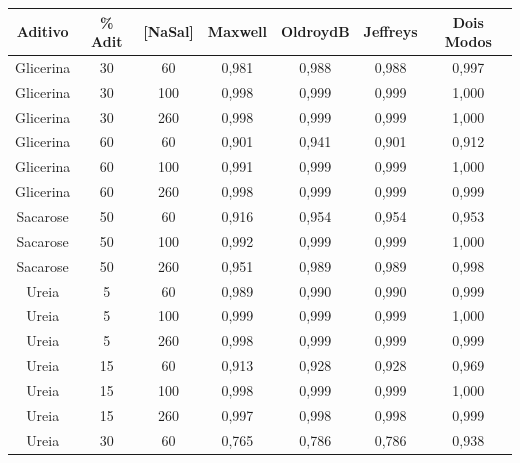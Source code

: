 	\begin{table}[h]
		{%
			\begin{tabular}{c c c | c c c c}
				\toprule
				 Aditivo  & \% Adit & [NaSal] & Maxwell & OldroydB & Jeffreys & Dois Modos \\ \midrule
				Glicerina & 30        & 60         & 0,981   & 0,988    & 0,988    & 0,997      \\
				Glicerina & 30        & 100        & 0,998   & 0,999    & 0,999    & 1,000      \\
				Glicerina & 30        & 260        & 0,998   & 0,999    & 0,999    & 1,000      \\
				Glicerina & 60        & 60         & 0,901   & 0,941    & 0,901    & 0,912      \\
				Glicerina & 60        & 100        & 0,991   & 0,999    & 0,999    & 1,000      \\
				Glicerina & 60        & 260        & 0,998   & 0,999    & 0,999    & 0,999      \\
				Sacarose  & 50        & 60         & 0,916   & 0,954    & 0,954    & 0,953      \\
				Sacarose  & 50        & 100        & 0,992   & 0,999    & 0,999    & 1,000      \\
				Sacarose  & 50        & 260        & 0,951   & 0,989    & 0,989    & 0,998      \\ \midrule
				  Ureia   & 5         & 60         & 0,989   & 0,990    & 0,990    & 0,999      \\
				  Ureia   & 5         & 100        & 0,999   & 0,999    & 0,999    & 1,000      \\
				  Ureia   & 5         & 260        & 0,998   & 0,999    & 0,999    & 0,999      \\
				  Ureia   & 15        & 60         & 0,913   & 0,928    & 0,928    & 0,969      \\
				  Ureia   & 15        & 100        & 0,998   & 0,999    & 0,999    & 1,000      \\
				  Ureia   & 15        & 260        & 0,997   & 0,998    & 0,998    & 0,999      \\
				  Ureia   & 30        & 60         & 0,765   & 0,786    & 0,786    & 0,938      \\

\end{tabular}}
\end{table}
